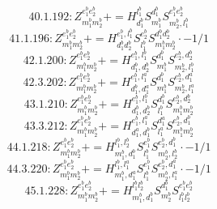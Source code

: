 \documentclass[letterpaper,10pt,fleqn,leqno,onecolumn]{article}
\begin{document}
\begin{equation} \;\;\;\;\;\;  40.1.192: Z^{e_{1}^{b}e_{2}^{b}}_{m_{1}^{b}m_{2}^{b}}+=H^{l_{1}^{b}}_{d_{1}^{b}}S^{d_{1}^{b}}_{m_{1}^{b}}S^{e_{1}^{b}e_{2}^{b}}_{m_{2}^{b},l_{1}^{b}} \end{equation}
\begin{equation} \;\;\;\;\;\;  41.1.196: Z^{e_{1}^{b}e_{2}^{b}}_{m_{1}^{b}m_{2}^{b}}+=H^{e_{1}^{b},l_{1}^{b}}_{d_{1}^{b}d_{2}^{b}}S^{e_{2}^{b}}_{l_{1}^{b}}S^{d_{1}^{b}d_{2}^{b}}_{m_{1}^{b}m_{2}^{b}}\cdot -1/1 \end{equation}
\begin{equation} \;\;\;\;\;\;  42.1.200: Z^{e_{1}^{b}e_{2}^{b}}_{m_{1}^{b}m_{2}^{b}}+=H^{e_{1}^{b},l_{1}^{b}}_{d_{1}^{b},d_{2}^{b}}S^{d_{1}^{b}}_{m_{1}^{b}}S^{e_{2}^{b},d_{2}^{b}}_{m_{2}^{b},l_{1}^{b}} \end{equation}
\begin{equation} \;\;\;\;\;\;  42.3.202: Z^{e_{1}^{b}e_{2}^{b}}_{m_{1}^{b}m_{2}^{b}}+=H^{e_{1}^{b},l_{1}^{a}}_{d_{1}^{b},d_{1}^{a}}S^{d_{1}^{b}}_{m_{1}^{b}}S^{e_{2}^{b},d_{1}^{a}}_{m_{2}^{b},l_{1}^{a}} \end{equation}
\begin{equation} \;\;\;\;\;\;  43.1.210: Z^{e_{1}^{b}e_{2}^{b}}_{m_{1}^{b}m_{2}^{b}}+=H^{e_{1}^{b},l_{1}^{b}}_{d_{1}^{b},d_{2}^{b}}S^{d_{1}^{b}}_{l_{1}^{b}}S^{e_{2}^{b},d_{2}^{b}}_{m_{1}^{b}m_{2}^{b}} \end{equation}
\begin{equation} \;\;\;\;\;\;  43.3.212: Z^{e_{1}^{b}e_{2}^{b}}_{m_{1}^{b}m_{2}^{b}}+=H^{e_{1}^{b},l_{1}^{a}}_{d_{1}^{a},d_{1}^{b}}S^{d_{1}^{a}}_{l_{1}^{a}}S^{e_{2}^{b},d_{1}^{b}}_{m_{1}^{b}m_{2}^{b}} \end{equation}
\begin{equation} \;\;\;\;\;\;  44.1.218: Z^{e_{1}^{b}e_{2}^{b}}_{m_{1}^{b}m_{2}^{b}}+=H^{l_{1}^{b},l_{2}^{b}}_{m_{1}^{b},d_{1}^{b}}S^{e_{1}^{b}}_{l_{1}^{b}}S^{e_{2}^{b},d_{1}^{b}}_{m_{2}^{b},l_{2}^{b}}\cdot -1/1 \end{equation}
\begin{equation} \;\;\;\;\;\;  44.3.220: Z^{e_{1}^{b}e_{2}^{b}}_{m_{1}^{b}m_{2}^{b}}+=H^{l_{1}^{b},l_{1}^{a}}_{m_{1}^{b},d_{1}^{a}}S^{e_{1}^{b}}_{l_{1}^{b}}S^{e_{2}^{b},d_{1}^{a}}_{m_{2}^{b},l_{1}^{a}}\cdot -1/1 \end{equation}
\begin{equation} \;\;\;\;\;\;  45.1.228: Z^{e_{1}^{b}e_{2}^{b}}_{m_{1}^{b}m_{2}^{b}}+=H^{l_{1}^{b}l_{2}^{b}}_{m_{1}^{b},d_{1}^{b}}S^{d_{1}^{b}}_{m_{2}^{b}}S^{e_{1}^{b}e_{2}^{b}}_{l_{1}^{b}l_{2}^{b}} \end{equation}
\end{document}
